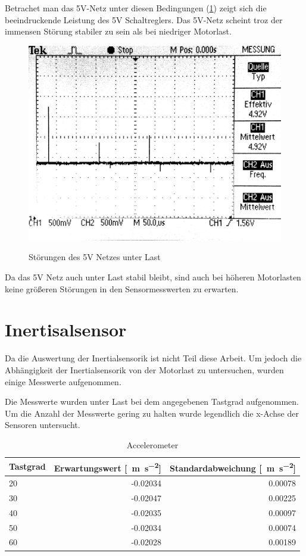 Betrachet man das 5V-Netz unter diesen Bedingungen (\cref{fig:5V_last}) zeigt sich die beeindruckende Leistung des 5V Schaltreglers.
Das 5V-Netz scheint troz der immensen Störung stabiler zu sein als bei niedriger Motorlast. 

\begin{figure}[H]
\centering
\includegraphics[width=.8\textwidth]{5V_LAST.png}\\
\caption{Störungen des 5V Netzes unter Last}%
\label{fig:5V_last}
\end{figure}

Da das 5V Netz auch unter Last stabil bleibt, sind auch bei höheren Motorlasten keine größeren Störungen in den Sensormesswerten zu erwarten.


\section{Inertisalsensor}

Da die Auswertung der Inertialsensorik ist nicht Teil diese Arbeit. Um jedoch die Abhängigkeit der Inertialsensorik von der Motorlast
zu untersuchen, wurden einige Messwerte aufgenommen.

Die Messwerte wurden unter Last bei dem angegebenen Tastgrad aufgenommen. Um die Anzahl der Messwerte gering zu halten wurde legendlich die x-Achse der Sensoren untersucht.

\begin{table}[H]
  \centering
  \begin{tabularx}{\textwidth}{|X|r|r|}
    \hline
     Tastgrad & Erwartungswert [\SI{}{\metre\per\second\squared}] & Standardabweichung [\SI{}{\metre\per\second\squared}]  \\ \hline \hline
     20 & -0.02034  & 0.00078 \\ \hline
     30 & -0.02047  & 0.00225 \\ \hline
     40 & -0.02035  & 0.00097 \\ \hline
     50 & -0.02034  & 0.00074 \\ \hline
     60 & -0.02028  & 0.00189 \\ \hline
  \end{tabularx}
  \caption{Accelerometer}%
  \label{tab:acc}
\end{table}

